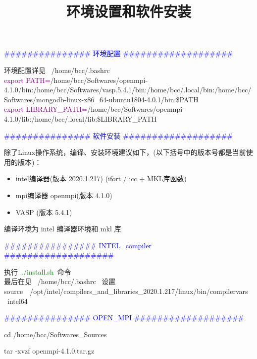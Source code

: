 \title{环境设置和软件安装}

\textcolor{blue}{\#\#\#\#\#\#\#\#\#\#\#\#\#\#\# 环境配置 \#\#\#\#\#\#\#\#\#\#\#\#\#\#\#\#\#\#\#}

环境配置详见~ /home/bcc/.bashrc\\
\textcolor{purple}{export PATH=}/home/bcc/Softwares/openmpi-4.1.0/bin:/home/bcc/Softwares/vasp.5.4.1/bin:/home/bcc/.local/bin:/home/bcc/Softwares/mongodb-linux-x86\_64-ubuntu1804-4.0.1/bin:\$PATH\\
\textcolor{purple}{export LIBRARY\_PATH=}/home/bcc/Softwares/openmpi-4.1.0/lib:/home/bcc/.local/lib:\$LIBRARY\_PATH

\textcolor{blue}{\#\#\#\#\#\#\#\#\#\#\#\#\#\#\# 软件安装 \#\#\#\#\#\#\#\#\#\#\#\#\#\#\#\#\#\#\#}

除了\textrm{Linux}操作系统，编译、安装环境建议如下，(以下括号中的版本号都是当前使用的版本)：\\
\begin{itemize}
	\item intel编译器(版本 2020.1.217) (ifort / icc + MKL库函数)
	\item mpi编译器 openmpi(版本 4.1.0)
	\item VASP (版本 5.4.1)
\end{itemize}

编译环境为 \textrm{intel} 编译器环境和 \textrm{mkl} 库

\textcolor{blue}{\#\#\#\#\#\#\#\#\#\#\#\#\#\#\#\# INTEL\_compiler \#\#\#\#\#\#\#\#\#\#\#\#\#\#\#\#\#\#\#}

执行~\textcolor{green}{./install.sh}~命令\\

最后在见~ /home/bcc/.bashrc~ 设置\\

{source~~/opt/intel/compilers\_and\_libraries\_2020.1.217/linux/bin/compilervars~~intel64}

\textcolor{blue}{\#\#\#\#\#\#\#\#\#\#\#\#\#\#\# OPEN\_MPI \#\#\#\#\#\#\#\#\#\#\#\#\#\#\#\#\#\#\#}

cd /home/bcc/Softwares\_Sources

tar -xvzf openmpi-4.1.0.tar.gz

